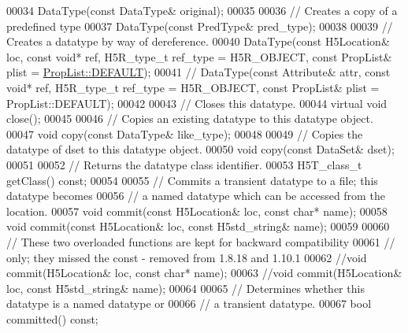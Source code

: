 \begin{DoxyCode}
00034         DataType(\textcolor{keyword}{const} DataType& original);
00035 
00036         \textcolor{comment}{// Creates a copy of a predefined type}
00037         DataType(\textcolor{keyword}{const} PredType& pred\_type);
00038 
00039         \textcolor{comment}{// Creates a datatype by way of dereference.}
00040         DataType(\textcolor{keyword}{const} H5Location& loc, \textcolor{keyword}{const} \textcolor{keywordtype}{void}* ref, H5R\_type\_t ref\_type = H5R\_OBJECT, \textcolor{keyword}{const} PropList& 
      plist = \hyperlink{class_h5_1_1_prop_list_ae52af66ce82af0ea7e6dc57148c56241}{PropList::DEFAULT});
00041 \textcolor{comment}{//        DataType(const Attribute& attr, const void* ref, H5R\_type\_t ref\_type = H5R\_OBJECT, const
       PropList& plist = PropList::DEFAULT);}
00042 
00043         \textcolor{comment}{// Closes this datatype.}
00044         \textcolor{keyword}{virtual} \textcolor{keywordtype}{void} close();
00045 
00046         \textcolor{comment}{// Copies an existing datatype to this datatype object.}
00047         \textcolor{keywordtype}{void} copy(\textcolor{keyword}{const} DataType& like\_type);
00048 
00049         \textcolor{comment}{// Copies the datatype of dset to this datatype object.}
00050         \textcolor{keywordtype}{void} copy(\textcolor{keyword}{const} DataSet& dset);
00051 
00052         \textcolor{comment}{// Returns the datatype class identifier.}
00053         H5T\_class\_t getClass() \textcolor{keyword}{const};
00054 
00055         \textcolor{comment}{// Commits a transient datatype to a file; this datatype becomes}
00056         \textcolor{comment}{// a named datatype which can be accessed from the location.}
00057         \textcolor{keywordtype}{void} commit(\textcolor{keyword}{const} H5Location& loc, \textcolor{keyword}{const} \textcolor{keywordtype}{char}* name);
00058         \textcolor{keywordtype}{void} commit(\textcolor{keyword}{const} H5Location& loc, \textcolor{keyword}{const} H5std\_string& name);
00059 
00060         \textcolor{comment}{// These two overloaded functions are kept for backward compatibility}
00061         \textcolor{comment}{// only; they missed the const - removed from 1.8.18 and 1.10.1}
00062         \textcolor{comment}{//void commit(H5Location& loc, const char* name);}
00063         \textcolor{comment}{//void commit(H5Location& loc, const H5std\_string& name);}
00064 
00065         \textcolor{comment}{// Determines whether this datatype is a named datatype or}
00066         \textcolor{comment}{// a transient datatype.}
00067         \textcolor{keywordtype}{bool} committed() \textcolor{keyword}{const};

\end{DoxyCode}
